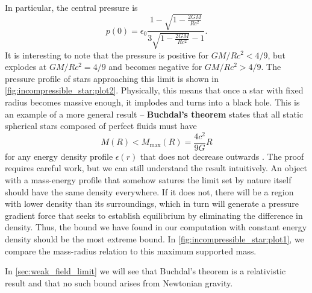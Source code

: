 In particular, the central pressure is
\begin{equation}
	p(0) = \epsilon_0 \frac{1 - \sqrt{1 - \frac{2GM}{Rc^2}}}{3 \sqrt{1-\frac{2GM}{Rc^2}} - 1} .
	\label{eq:incompressible_star:central_pressure}
\end{equation}
It is interesting to note that the pressure is positive for $GM/Rc^2 < 4/9$, but explodes at $GM/Rc^2 = 4/9$ and becomes negative for $GM/Rc^2 > 4/9$.
The pressure profile of stars approaching this limit is shown in \cref{fig:incompressible_star:plot2}.
Physically, this means that once a star with fixed radius becomes massive enough, it implodes and turns into a black hole.
This is an example of a more general result -- \textbf{Buchdal's theorem} states that all static spherical stars composed of perfect fluids must have
\begin{equation}
	M(R) < M_\text{max}(R) = \frac{4c^2}{9G} R
	\label{eq:incompressible_star:buchdal}
\end{equation}
for any energy density profile $\epsilon(r)$ that does not decrease outwards \cite{ref:buchdal}.
The proof requires careful work, but we can still understand the result intuitively.
An object with a mass-energy profile that somehow satures the limit set by nature itself should have the same density everywhere.
If it does not, there will be a region with lower density than its surroundings, which in turn will generate a pressure gradient force that seeks to establish equilibrium by eliminating the difference in density.
Thus, the bound we have found in our computation with constant energy density should be the most extreme bound.
In \cref{fig:incompressible_star:plot1}, we compare the mass-radius relation to this maximum supported mass.

In \cref{sec:weak_field_limit} we will see that Buchdal's theorem is a relativistic result and that no such bound arises from Newtonian gravity.

